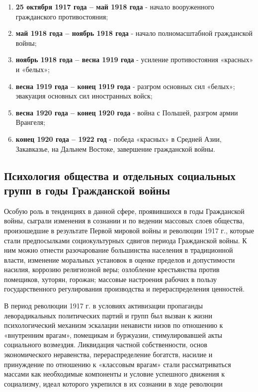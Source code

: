 \documentclass{article}
\begin{document}
\begin{enumerate}
    \item \textbf{25 октября 1917 года – май 1918 года} - начало вооруженного гражданского противостояния;
    \item \textbf{май 1918 года – ноябрь 1918 года} - начало полномасштабной гражданской войны;
    \item \textbf{ноябрь 1918 года – весна 1919 года} - усиление противостояния «красных» и «белых»;
    \item \textbf{весна 1919 года – конец 1919 года} - разгром основных сил «белых»; эвакуация основных сил иностранных войск;
    \item \textbf{весна 1920 года – конец 1920 года} - война с Польшей, разгром армии Врангеля;
    \item \textbf{конец 1920 года – 1922 год} - победа «красных» в Средней Азии, Закавказье, на Дальнем Востоке, завершение гражданской войны. 
\end{enumerate}

\pagebreak
\subsection{Психология общества и отдельных социальных групп в годы Гражданской войны}

Особую роль в тенденциях в данной сфере, проявившихся в
годы Гражданской войны, сыграли изменения в сознании и по ведении массовых слоев общества, произошедшие в результате Первой мировой войны и революции 1917 г., которые стали предпосылками социокультурных сдвигов периода Гражданской войны. К ним можно отнести разочарование большинства населения в традиционной власти, изменение моральных установок в оценке пределов и допустимости насилия, коррозию религиозной веры; озлобление крестьянства против помещиков, хуторян, горожан; массовые настроения рабочих в пользу государственного регулирования производства и перераспределения ценностей.

\hfill

В период революции 1917 г. в условиях активизации пропаганды леворадикальных политических партий и групп был вызван к жизни психологический механизм эскалации ненависти низов по отношению к «внутренним врагам», помещикам и буржуазии, стимулировавшей акты социального возмездия. Ликвидация частной собственности, основ экономического неравенства, перераспределение богатств, насилие и принуждение по отношению к «классовым врагам» стали рассматриваться массами как необходимые компоненты и условие успешного движения к социализму, идеал которого укрепился в их сознании в ходе революции
\end{document}
